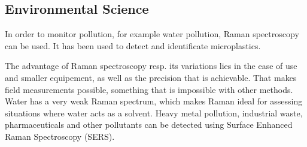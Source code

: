 \subsection{Environmental Science}

In order to monitor pollution, for example water pollution, Raman spectroscopy can be used. It has been used to detect and identificate microplastics.\cite{micropl}

\bigskip

The advantage of Raman spectroscopy resp. its variations lies in the ease of use and smaller equipement, as well as the precision that is achievable. That makes field measurements possible, something that is impossible with other methods. Water has a very weak Raman spectrum, which makes Raman ideal for assessing situations where water acts as a solvent. Heavy metal pollution, industrial waste, pharmaceuticals and other pollutants can be detected using Surface Enhanced Raman Spectroscopy (SERS). \cite{RSAA}